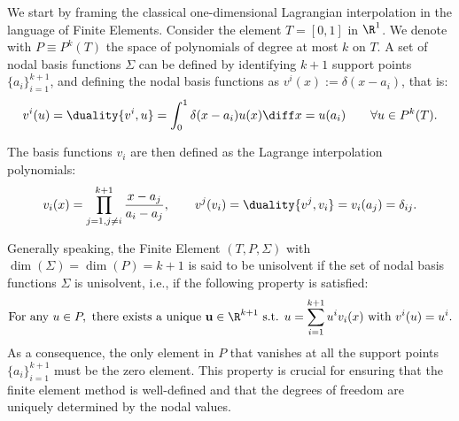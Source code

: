 We start by framing the classical one-dimensional Lagrangian interpolation in the language of Finite Elements. Consider the element $T=[0,1]$ in $\R^1$. We denote with $P \equiv P^k(T)$ the space of polynomials of degree at most $k$ on $T$. A set of nodal basis functions $\Sigma$ can be defined by identifying $k+1$ support points $\{a_i\}_{i=1}^{k+1}$, and defining the nodal basis functions as $v^i(x) := \delta(x-a_i)$, that is:
\[
v^i(u) = \duality{v^i, u} = \int_0^1 \delta(x-a_i) u(x) \diff x = u(a_i) \qquad \forall u \in P^k(T).
\]

The basis functions $v_i$ are then defined as the Lagrange interpolation polynomials:
\[
v_i(x) = \prod_{j=1, j\ne i}^{k+1} \frac{x-a_j}{a_i-a_j}, \qquad v^j(v_i) = \duality{v^j, v_i} = v_i(a_j) = \delta_{ij}.
\]

Generally speaking, the Finite Element $(T, P, \Sigma)$ with $\dim(\Sigma) = \dim(P) = k+1$ is said to be unisolvent if the set of nodal basis functions $\Sigma$ is unisolvent, i.e., if the following property is satisfied:
\begin{equation}
\text{For any } u \in P, \text{ there exists a unique } \mathbf{u} \in \R^{k+1} \text{ s.t. } u = \sum_{i=1}^{k+1} u^i v_i(x) \text{ with } v^i(u) = u^i.
  \label{eqn:unisolvent}
\end{equation}
As a consequence, the only element in $P$ that vanishes at all the support points $\{a_i\}_{i=1}^{k+1}$ must be the zero element. This property is crucial for ensuring that the finite element method is well-defined and that the degrees of freedom are uniquely determined by the nodal values.
